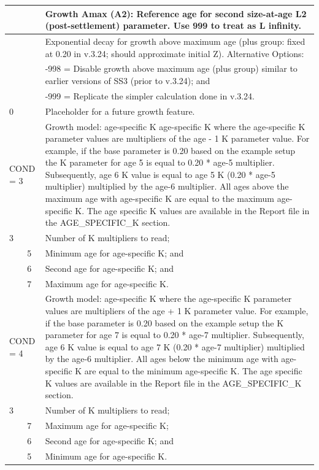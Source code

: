 \begin{longtable}{p{0.5cm} p{2cm} p{12.5cm}}
	\Tstrut 25 & & Growth Amax (A2): Reference age for second size-at-age L2 (post-settlement) parameter. Use 999 to treat as L infinity. \Bstrut\\
	\hline
	
	\Tstrut 0.20 & & Exponential decay for growth above maximum age (plus group: fixed at 0.20 in v.3.24; should approximate initial Z). Alternative Options: \\
				 & & -998 = Disable growth above maximum age (plus group) similar to earlier versions of SS3 (prior to v.3.24); and \\
				 & & -999 = Replicate the simpler calculation done in v.3.24. \Bstrut\\
	\hline
	
	0 & & Placeholder for a future growth feature. \Tstrut\Bstrut\\
	\hline

	\multicolumn{2}{l}{COND = 3} & Growth model: age-specific K age-specific K where the age-specific K parameter values are multipliers of the age - 1 K parameter value. For example, if the base parameter is 0.20 based on the example setup the K parameter for age 5 is equal to 0.20 * age-5 multiplier. Subsequently, age 6 K value is equal to age 5 K (0.20 * age-5 multiplier) multiplied by the age-6 multiplier. All ages above the maximum age with age-specific K are equal to the maximum age-specific K. The age specific K values are available in the Report file in the AGE\_SPECIFIC\_K section. \\
	3 & & Number of K multipliers to read; \\
	& 5 & Minimum age for age-specific K; and \\
	& 6 & Second age for age-specific K; and \\
	& 7 & Maximum age for age-specific K. \Bstrut\\
	
	\multicolumn{2}{l}{COND = 4} & Growth model: age-specific K where the age-specific K parameter values are multipliers of the age + 1 K parameter value. For example, if the base parameter is 0.20 based on the example setup the K parameter for age 7 is equal to 0.20 * age-7 multiplier. Subsequently, age 6 K value is equal to age 7 K (0.20 * age-7 multiplier) multiplied by the age-6 multiplier. All ages below the minimum age with age-specific K are equal to the minimum age-specific K. The age specific K values are available in the Report file in the AGE\_SPECIFIC\_K section. \\
	3 & & Number of K multipliers to read; \\
	  & 7 & Maximum age for age-specific K; \\
	  & 6 & Second age for age-specific K; and \\
	  & 5 & Minimum age for age-specific K. \Bstrut\\
	\hline
	

\end{longtable}
